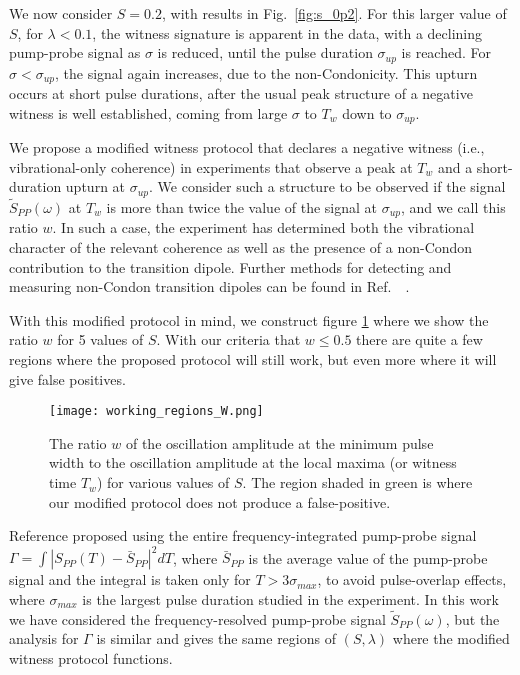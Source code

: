 We now consider $S=0.2$, with results in Fig.\ \ref{fig:s_0p2}. For this larger value of $S$, for $\lambda<0.1$, the witness signature is apparent in the data, with a declining pump-probe signal as $\sigma$ is reduced, until the pulse duration $\sigma_{up}$ is reached. For $\sigma<\sigma_{up}$, the signal again increases, due to the non-Condonicity. This upturn occurs at short pulse durations, after the usual peak structure of a negative witness is well established, coming from large $\sigma$ to $T_w$ down to $\sigma_{up}$.

We propose a modified witness protocol that declares a negative witness (i.e., vibrational-only coherence) in experiments that observe a peak at $T_w$ and a short-duration upturn at $\sigma_{up}$. We consider such a structure to be observed if the signal $\tilde{S}_{PP}(\omega)$ at $T_w$ is more than twice the value of the signal at $\sigma_{up}$, and we call this ratio $w$. In such a case, the experiment has determined both the vibrational character of the relevant coherence as well as the presence of a non-Condon contribution to the transition dipole. Further methods for detecting and measuring non-Condon transition dipoles can be found in Ref.\  ~\cite{myDetectingNonCondonPaper}.

With this modified protocol in mind, we construct figure \ref{fig:working_regions_W} where we show the ratio $w$ for 5 values of $S$.  With our criteria that $w \leq 0.5$ there are quite a few regions where the proposed protocol will still work, but even more where it will give false positives.

\begin{figure}
   \texttt{[image: working\_regions\_W.png]}
   \caption{The ratio $w$ of the oscillation amplitude at the minimum pulse width to the oscillation amplitude at the local maxima (or witness time $T_w$) for various values of $S$.  The region shaded in green is where our modified protocol does not produce a false-positive. }
	\label{fig:working_regions_W}
\end{figure}

Reference \cite{allanWitness} proposed using the entire frequency-integrated pump-probe signal $\Gamma=\int |S_{PP}(T)-\bar{S}_{PP}|^2 dT$, where $\bar{S}_{PP}$ is the average value of the pump-probe signal and the integral is taken only for $T>3\sigma_{max}$, to avoid pulse-overlap effects, where $\sigma_{max}$ is the largest pulse duration studied in the experiment. In this work we have considered the frequency-resolved pump-probe signal $\tilde{S}_{PP}(\omega)$, but the analysis for $\Gamma$ is similar and gives the same regions of $(S,\lambda)$ where the modified witness protocol functions.

